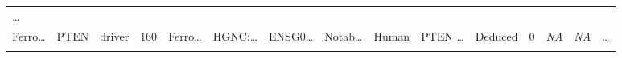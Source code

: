 \documentclass[
]{article}
\begin{document}
\begin{longtable}[]{@{}lllllllllllllll@{}}
\begin{minipage}[t]{0.02\columnwidth}
\ldots{}\strut
\end{minipage}\tabularnewline
\begin{minipage}[t]{0.05\columnwidth}\raggedright
Ferro\ldots{}\strut
\end{minipage} & \begin{minipage}[t]{0.05\columnwidth}\raggedright
PTEN\strut
\end{minipage} & \begin{minipage}[t]{0.04\columnwidth}\raggedright
driver\strut
\end{minipage} & \begin{minipage}[t]{0.02\columnwidth}\raggedright
160\strut
\end{minipage} & \begin{minipage}[t]{0.05\columnwidth}\raggedright
Ferro\ldots{}\strut
\end{minipage} & \begin{minipage}[t]{0.05\columnwidth}\raggedright
HGNC:\ldots{}\strut
\end{minipage} & \begin{minipage}[t]{0.05\columnwidth}\raggedright
ENSG0\ldots{}\strut
\end{minipage} & \begin{minipage}[t]{0.05\columnwidth}\raggedright
Notab\ldots{}\strut
\end{minipage} & \begin{minipage}[t]{0.05\columnwidth}\raggedright
Human\strut
\end{minipage} & \begin{minipage}[t]{0.05\columnwidth}\raggedright
PTEN \ldots{}\strut
\end{minipage} & \begin{minipage}[t]{0.05\columnwidth}\raggedright
Deduced\strut
\end{minipage} & \begin{minipage}[t]{0.05\columnwidth}\raggedright
0\strut
\end{minipage} & \begin{minipage}[t]{0.05\columnwidth}\raggedright
\emph{NA}\strut
\end{minipage} & \begin{minipage}[t]{0.05\columnwidth}\raggedright
\emph{NA}\strut
\end{minipage} & \begin{minipage}[t]{0.02\columnwidth}\raggedright
\ldots{}\strut
\end{minipage}\tabularnewline
\begin{minipage}[t]{0.05\columnwidth}\raggedright

\end{minipage}
\end{longtable}
\end{document}
